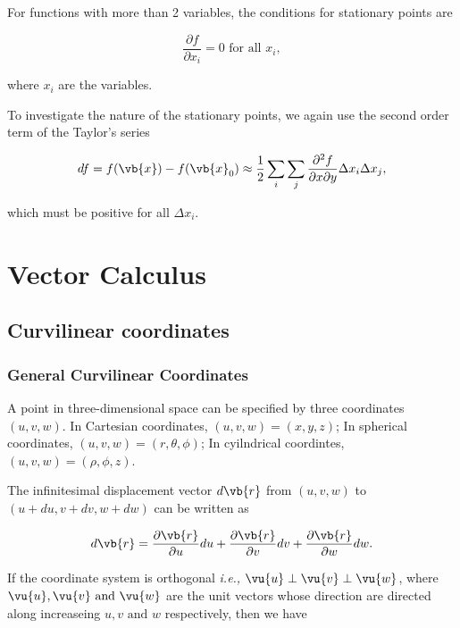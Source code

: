 \documentclass[english,a4paper,12pt]{report}
\begin{document}
For functions with more than 2 variables, the conditions for stationary points are 

\begin{equation}
    \frac{\partial f}{\partial x_{i} } = 0 \text{ for all }  x_{i},
\end{equation}

where \(x_{i} \) are the variables. 

To investigate the nature of the stationary points, we again use the second order term of the Taylor's series

\begin{equation}
    df = f(\vb{x} ) - f(\vb{x} _{0} ) \approx \frac{1}{2}\sum_{i} \sum_{j} \frac{\partial^2 f}{\partial x \partial y} \Delta x_{i}\Delta x_{j},      
\end{equation}

which must be positive for all \(\Delta x_{i} \).

\chapter{Vector Calculus}

\section{Curvilinear coordinates}

\subsection{General Curvilinear Coordinates}

A point in three-dimensional space can be specified by three coordinates \((u,v,w)\). In Cartesian coordinates, \((u,v,w) = (x,y,z)\); In spherical coordinates, \((u,v,w) = (r, \theta, \phi)\); In cyilndrical coordintes, \((u,v,w) = (\rho, \phi, z)\). 

The infinitesimal displacement vector \(d \vb{r} \)  from \((u,v,w)\) to \((u+du, v+dv, w+dw)\) can be written as

\begin{equation} 
	d\vb{r} = \frac{\partial \vb{r} }{\partial u} du + \frac{\partial \vb{r} }{\partial v}dv + \frac{\partial \vb{r} }{\partial w}dw. 
\end{equation}

If the coordinate system is orthogonal \textit{i.e.,} \(\vu{u} \perp \vu{v} \perp \vu{w}\), where \(\vu{u} ,\vu{v} \text { and } \vu{w} \) are the unit vectors whose direction are directed along increaseing \(u, v \text { and } w\) respectively, then we have
\end{document}
